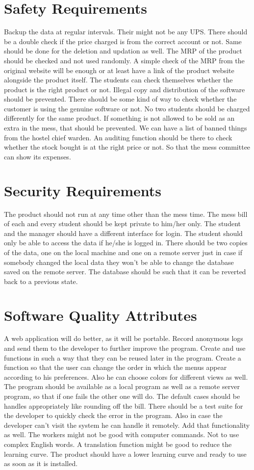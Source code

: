 \documentclass{scrreprt}
\begin{document}
\section{Safety Requirements}
Backup the data at regular intervals. Their might not be any UPS.
There should be a double check if the price charged is from the correct account or not. Same should be done for the deletion and updation as well. The MRP of the product should be checked and not used randomly. A simple check of the MRP from the original website will be enough or at least have a link of the product website alongside the product itself. The students can check themselves whether the product is the right product or not.
Illegal copy and distribution of the software should be prevented.
There should be some kind of way to check whether the customer is using the genuine software or not.
No two students should be charged differently for the same product.
If something is not allowed to be sold as an extra in the mess, that should be prevented. We can have a list of banned things from the hostel chief warden.
An auditing function should be there to check whether the stock bought is at the right price or not. So that the mess committee can show its expenses.

\section{Security Requirements}
The product should not run at any time other than the mess time.
The mess bill of each and every student should be kept private to him/her only. The student and the manager should have a different interface for login. The student should only be able to access the data if he/she is logged in.
There should be two copies of the data, one on the local machine and one on a remote server just in case if somebody changed the local data they won't be able to change the database saved on the remote server.
The database should be such that it can be reverted back to a previous state.

\section{Software Quality Attributes}
A web application will do better, as it will be portable. Record anonymous logs and send them to the developer to further improve the program. Create and use functions in such a way that they can be reused later in the program. Create a function so that the user can change the order in which the menus appear according to his preferences. Also he can choose colors for different views as well. The program should be available as a local program as well as a remote server program, so that if one fails the other one will do. The default cases should be handles appropriately like rounding off the bill. There should be a test suite for the developer to quickly check the error in the program.
Also in case the developer can't visit the system he can handle it remotely. Add that functionality as well.
The workers might not be good with computer commands. Not to use complex English words. A translation function might be good to reduce the learning curve.
The product should have a lower learning curve and ready to use as soon as it is installed.
\end{document}
